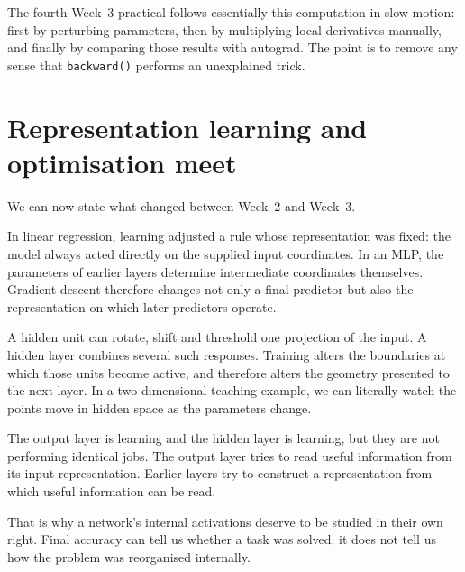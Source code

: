 The fourth Week~3 practical follows essentially this computation in slow motion: first by perturbing parameters, then by multiplying local derivatives manually, and finally by comparing those results with autograd. The point is to remove any sense that \texttt{backward()} performs an unexplained trick.

\section{Representation learning and optimisation meet}

We can now state what changed between Week~2 and Week~3.

In linear regression, learning adjusted a rule whose representation was fixed: the model always acted directly on the supplied input coordinates. In an MLP, the parameters of earlier layers determine intermediate coordinates themselves. Gradient descent therefore changes not only a final predictor but also the representation on which later predictors operate.

A hidden unit can rotate, shift and threshold one projection of the input. A hidden layer combines several such responses. Training alters the boundaries at which those units become active, and therefore alters the geometry presented to the next layer. In a two-dimensional teaching example, we can literally watch the points move in hidden space as the parameters change.

The output layer is learning and the hidden layer is learning, but they are not performing identical jobs. The output layer tries to read useful information from its input representation. Earlier layers try to construct a representation from which useful information can be read.

That is why a network's internal activations deserve to be studied in their own right. Final accuracy can tell us whether a task was solved; it does not tell us how the problem was reorganised internally.


